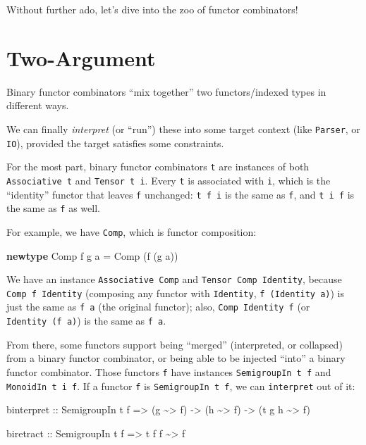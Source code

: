 \documentclass[]{article}
\newenvironment{Shaded}{}{}
\newcommand{\DataTypeTok}[1]{\textcolor[rgb]{0.56,0.13,0.00}{#1}}
\newcommand{\KeywordTok}[1]{\textcolor[rgb]{0.00,0.44,0.13}{\textbf{#1}}}
\newcommand{\NormalTok}[1]{#1}
\newcommand{\OperatorTok}[1]{\textcolor[rgb]{0.40,0.40,0.40}{#1}}
\newcommand{\OtherTok}[1]{\textcolor[rgb]{0.00,0.44,0.13}{#1}}
\begin{document}
Without further ado, let's dive into the zoo of functor combinators!

\hypertarget{two-argument}{%
\section{Two-Argument}\label{two-argument}}

Binary functor combinators ``mix together'' two functors/indexed types in
different ways.

We can finally \emph{interpret} (or ``run'') these into some target context
(like \texttt{Parser}, or \texttt{IO}), provided the target satisfies some
constraints.

For the most part, binary functor combinators \texttt{t} are instances of both
\texttt{Associative\ t} and \texttt{Tensor\ t\ i}. Every \texttt{t} is
associated with \texttt{i}, which is the ``identity'' functor that leaves
\texttt{f} unchanged: \texttt{t\ f\ i} is the same as \texttt{f}, and
\texttt{t\ i\ f} is the same as \texttt{f} as well.

For example, we have \texttt{Comp}, which is functor composition:

\begin{Shaded}
\begin{Highlighting}[]
\KeywordTok{newtype} \DataTypeTok{Comp}\NormalTok{ f g a }\OtherTok{=} \DataTypeTok{Comp}\NormalTok{ (f (g a))}
\end{Highlighting}
\end{Shaded}

We have an instance \texttt{Associative\ Comp} and
\texttt{Tensor\ Comp\ Identity}, because \texttt{Comp\ f\ Identity} (composing
any functor with \texttt{Identity}, \texttt{f\ (Identity\ a)}) is just the same
as \texttt{f\ a} (the original functor); also, \texttt{Comp\ Identity\ f} (or
\texttt{Identity\ (f\ a)}) is the same as \texttt{f\ a}.

From there, some functors support being ``merged'' (interpreted, or collapsed)
from a binary functor combinator, or being able to be injected ``into'' a binary
functor combinator. Those functors \texttt{f} have instances
\texttt{SemigroupIn\ t\ f} and \texttt{MonoidIn\ t\ i\ f}. If a functor
\texttt{f} is \texttt{SemigroupIn\ t\ f}, we can \texttt{interpret} out of it:

\begin{Shaded}
\begin{Highlighting}[]
\NormalTok{binterpret}
\OtherTok{    ::} \DataTypeTok{SemigroupIn}\NormalTok{ t f}
    \OtherTok{=>}\NormalTok{ (g }\OperatorTok{\textasciitilde{}>}\NormalTok{ f)}
    \OtherTok{{-}>}\NormalTok{ (h }\OperatorTok{\textasciitilde{}>}\NormalTok{ f)}
    \OtherTok{{-}>}\NormalTok{ (t g h }\OperatorTok{\textasciitilde{}>}\NormalTok{ f)}

\NormalTok{biretract}
\OtherTok{    ::} \DataTypeTok{SemigroupIn}\NormalTok{ t f}
    \OtherTok{=>}\NormalTok{ t f f }\OperatorTok{\textasciitilde{}>}\NormalTok{ f}
\end{Highlighting}
\end{Shaded}
\end{document}
